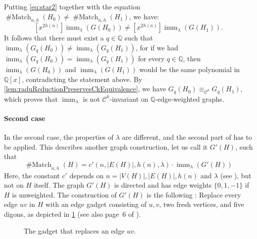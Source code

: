 \documentclass[11pt, DIV=15]{scrarticle}
\theoremstyle{definition}
\theoremstyle{plain}
\theoremstyle{remark}
\newcommand{\bbQ}{\mathbb{Q}}
\DeclareMathOperator{\imm}{imm}
\DeclareMathOperator{\Match}{\# Match}
\begin{document}
Putting \cref{eq:star2}  together with the equation $\Match_{n,h}(H_0) \neq \Match_{n,h}(H_1)$, we have:
\[
 [x^{2h(n)}] \imm_{\lambda}(G(H_0)) \neq [x^{2h(n)}] \imm_{\lambda}(G(H_1)).
\]
It follows that there must exist a $q \in \bbQ$ such that $\imm_{\lambda}(G_q(H_0)) \neq \imm_{\lambda}(G_q(H_1))$, for if we had $\imm_{\lambda}(G_q(H_0)) = \imm_{\lambda}(G_q(H_1))$ for every $q \in \bbQ$, then $\imm_{\lambda}(G(H_0))$ and $\imm_{\lambda}(G(H_1))$ would be the same polynomial in $\bbQ[x]$, contradicting the statement above. 
By \cref{lem:raduReductionPreservesCkEquivalence}, we have $G_q(H_0) \equiv_{\mathcal{C}^k} G_q(H_1)$, which proves that $\imm_{\lambda}$ is not $\mathcal{C}^k$-invariant on $\bbQ$-edge-weighted graphs. 

\paragraph*{Second case}
In the second case, the properties of $\lambda$ are different, and the second part of \cite[Lemma 28]{curticapean2021full} has to be applied. 
This describes another graph construction, let us call it $G'(H)$, such that
\begin{equation}
\Match_{n,h}(H) = c'(n, |E(H)|, h(n), \lambda) \cdot \imm_{\lambda}(G'(H)) \label{eq:2stars}
\end{equation}
Here, the constant $c'$ depends on $n=|V(H)|, |E(H)|, h(n)$ and $\lambda$ (see \cite[Lemma 28]{curticapean2021complexitydichotomyimmanantfamilies}), but not on $H$ itself.
The graph $G'(H)$ is directed and has edge weights $\{0,1,-1\}$ if $H$ is unweighted.
The construction of $G'(H)$ is the following \cite[Lemma 28]{curticapean2021complexitydichotomyimmanantfamilies}: Replace
every edge $uv$ in $H$ with an edge gadget consisting of $u, v$, two
fresh vertices, and five digons, as depicted in \cref{fig:gadget} (see also page~6 of \cite{curticapean2021complexitydichotomyimmanantfamilies}).
\begin{figure}
\centering
{}
\caption{The gadget that replaces an edge $uv$.\label{fig:gadget}}
\end{figure}
\end{document}
